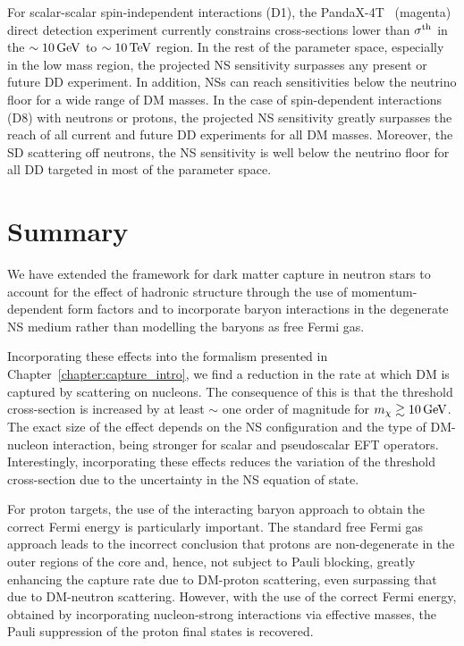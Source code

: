 For scalar-scalar spin-independent interactions (D1), the %
PandaX-4T~\cite{PandaX-4T:2021bab_dec_DarkMatterSearch} 
(magenta) direct detection experiment currently constrains cross-sections lower than $\sigma^{\rm th}$ in the $\sim 10{\rm \,GeV}$ to $\sim 10{\rm \,TeV}$ region. In the rest of the parameter space, especially in the low mass region, the projected NS sensitivity surpasses any present or future DD experiment. In addition, NSs can reach sensitivities below the neutrino floor for a wide range of DM masses. In the case of spin-dependent interactions (D8) with neutrons or protons, the projected NS sensitivity greatly surpasses the reach of all current and future DD experiments for all DM masses. Moreover, the SD scattering off neutrons, the NS sensitivity is well below the neutrino floor for all DD targeted in most of the parameter space. 


\section{Summary}
\label{ch5:sec:summary}

We have extended the framework for dark matter capture in neutron stars to account for the effect of hadronic structure through the use of momentum-dependent form factors and to incorporate baryon interactions in the degenerate NS medium rather than modelling the baryons as free Fermi gas. 

Incorporating these effects into the formalism presented in Chapter~\ref{chapter:capture_intro}, we find a reduction in the rate at which DM is captured by scattering on nucleons.  The consequence of this is that the threshold cross-section is increased by at least $\sim$ one order of magnitude for $m_\chi\gtrsim10{\rm \,GeV}$. The exact size of the effect depends on the NS configuration and the type of DM-nucleon interaction, being stronger for scalar and pseudoscalar EFT operators. Interestingly, incorporating these effects reduces the variation of the threshold cross-section due to the uncertainty in the NS equation of state.

For proton targets, the use of the interacting baryon approach to obtain the correct Fermi energy is particularly important.  The standard free Fermi gas approach leads to the incorrect conclusion that protons are non-degenerate in the outer regions of the core and, hence, not subject to Pauli blocking, greatly enhancing the capture rate due to DM-proton scattering, even surpassing that due to DM-neutron scattering.  However, with the use of the correct Fermi energy, obtained by incorporating nucleon-strong interactions via effective masses, the Pauli suppression of the proton final states is recovered. 

